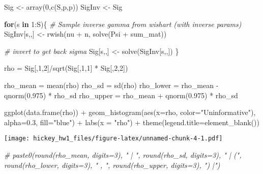 \documentclass[
]{article}
\newenvironment{Shaded}{\begin{snugshade}}{\end{snugshade}}
\newcommand{\AttributeTok}[1]{\textcolor[rgb]{0.77,0.63,0.00}{#1}}
\newcommand{\CommentTok}[1]{\textcolor[rgb]{0.56,0.35,0.01}{\textit{#1}}}
\newcommand{\ControlFlowTok}[1]{\textcolor[rgb]{0.13,0.29,0.53}{\textbf{#1}}}
\newcommand{\DecValTok}[1]{\textcolor[rgb]{0.00,0.00,0.81}{#1}}
\newcommand{\FloatTok}[1]{\textcolor[rgb]{0.00,0.00,0.81}{#1}}
\newcommand{\FunctionTok}[1]{\textcolor[rgb]{0.00,0.00,0.00}{#1}}
\newcommand{\NormalTok}[1]{#1}
\newcommand{\OtherTok}[1]{\textcolor[rgb]{0.56,0.35,0.01}{#1}}
\newcommand{\SpecialCharTok}[1]{\textcolor[rgb]{0.00,0.00,0.00}{#1}}
\newcommand{\StringTok}[1]{\textcolor[rgb]{0.31,0.60,0.02}{#1}}
\begin{document}
\begin{Shaded}
\begin{Highlighting}[]
\NormalTok{Sig }\OtherTok{\textless{}{-}} \FunctionTok{array}\NormalTok{(}\DecValTok{0}\NormalTok{,}\FunctionTok{c}\NormalTok{(S,p,p))}
\NormalTok{SigInv }\OtherTok{\textless{}{-}}\NormalTok{ Sig}

\ControlFlowTok{for}\NormalTok{(s }\ControlFlowTok{in} \DecValTok{1}\SpecialCharTok{:}\NormalTok{S)\{}
  \CommentTok{\#  Sample inverse gamma from wishart (with inverse params)}
\NormalTok{   SigInv[s,,] }\OtherTok{\textless{}{-}} \FunctionTok{rwish}\NormalTok{(nu }\SpecialCharTok{+}\NormalTok{ n, }\FunctionTok{solve}\NormalTok{(Psi }\SpecialCharTok{+}\NormalTok{ sum\_mat))}
   
   \CommentTok{\# invert to get back sigma }
\NormalTok{   Sig[s,,]    }\OtherTok{\textless{}{-}} \FunctionTok{solve}\NormalTok{(SigInv[s,,])}
\NormalTok{\}}

\NormalTok{rho }\OtherTok{=}\NormalTok{ Sig[,}\DecValTok{1}\NormalTok{,}\DecValTok{2}\NormalTok{]}\SpecialCharTok{/}\FunctionTok{sqrt}\NormalTok{(Sig[,}\DecValTok{1}\NormalTok{,}\DecValTok{1}\NormalTok{] }\SpecialCharTok{*}\NormalTok{ Sig[,}\DecValTok{2}\NormalTok{,}\DecValTok{2}\NormalTok{])}

\NormalTok{rho\_mean }\OtherTok{=} \FunctionTok{mean}\NormalTok{(rho)}
\NormalTok{rho\_sd }\OtherTok{=} \FunctionTok{sd}\NormalTok{(rho)}
\NormalTok{rho\_lower }\OtherTok{=}\NormalTok{ rho\_mean }\SpecialCharTok{{-}} \FunctionTok{qnorm}\NormalTok{(}\FloatTok{0.975}\NormalTok{) }\SpecialCharTok{*}\NormalTok{ rho\_sd}
\NormalTok{rho\_upper }\OtherTok{=}\NormalTok{ rho\_mean }\SpecialCharTok{+} \FunctionTok{qnorm}\NormalTok{(}\FloatTok{0.975}\NormalTok{) }\SpecialCharTok{*}\NormalTok{ rho\_sd}


\FunctionTok{ggplot}\NormalTok{(}\FunctionTok{data.frame}\NormalTok{(rho)) }\SpecialCharTok{+} 
  \FunctionTok{geom\_histogram}\NormalTok{(}\FunctionTok{aes}\NormalTok{(}\AttributeTok{x=}\NormalTok{rho, }\AttributeTok{color=}\StringTok{"Uninformative"}\NormalTok{), }\AttributeTok{alpha=}\FloatTok{0.3}\NormalTok{, }\AttributeTok{fill=}\StringTok{"blue"}\NormalTok{) }\SpecialCharTok{+}
  \FunctionTok{labs}\NormalTok{(}\AttributeTok{x =} \StringTok{"rho"}\NormalTok{) }\SpecialCharTok{+}
  \FunctionTok{theme}\NormalTok{(}\AttributeTok{legend.title=}\FunctionTok{element\_blank}\NormalTok{())}
\end{Highlighting}
\end{Shaded}

\texttt{[image: hickey\_hw1\_files/figure-latex/unnamed-chunk-4-1.pdf]}

\begin{Shaded}
\begin{Highlighting}[]
\CommentTok{\# paste0(round(rho\_mean, digits=3), " | ", round(rho\_sd, digits=3), " | (", round(rho\_lower, digits=3), " , ", round(rho\_upper, digits=3), ") |")}
\end{Highlighting}
\end{Shaded}
\end{document}
